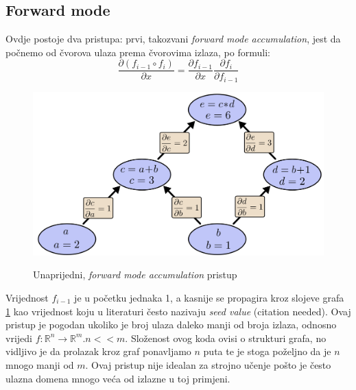 \documentclass[zavrsnirad]{fer}
\begin{document}
\subsection{Forward mode}
Ovdje postoje dva pristupa: prvi, takozvani \textit{forward mode accumulation}, jest da počnemo od čvorova ulaza prema čvorovima izlaza, po formuli:
\begin{equation}
  \frac{\partial (f_{i-1} \circ f_i)}{\partial x} = \frac{\partial f_{i-1}}{\partial x} \frac{\partial f_i}{\partial f_{i-1}}
\end{equation}
\begin{figure}[h]
  \centering
  \includegraphics[width=0.7\linewidth]{"./slike/forward_graph.png"}
  \caption{Unaprijedni, \textit{forward mode accumulation} pristup}
  \cite{wuciawe_github}
  \label{slk:forward_graph}
\end{figure}
Vrijednost $f_{i-1}$ je u početku jednaka 1, a kasnije se propagira kroz slojeve grafa \ref{slk:forward_graph} kao vrijednost koju u literaturi često nazivaju \textit{seed value} (citation needed). Ovaj pristup je pogodan ukoliko je broj ulaza daleko manji od broja izlaza, odnosno vrijedi $f\colon \mathbb{R}^n \rightarrow \mathbb{R}^m. n << m$. Složenost ovog koda ovisi o strukturi grafa, no vidljivo je da prolazak kroz graf ponavljamo $n$ puta te je stoga poželjno da je $n$ mnogo manji od $m$. Ovaj pristup nije idealan za strojno učenje pošto je često ulazna domena mnogo veća od izlazne u toj primjeni.
\\
\end{document}
